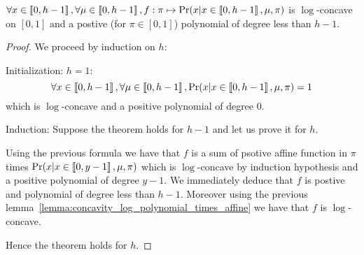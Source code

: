 \begin{thm}
    $\forall x \in \left\llbracket0, h - 1\right\rrbracket, \forall \mu \in \left\llbracket0, h - 1\right\rrbracket, f: \pi \mapsto \Pr(x | x \in \left\llbracket0, h - 1\right\rrbracket, \mu, \pi)$ is $\log$-concave on $[0, 1]$ and a postive (for $\pi \in [0, 1]$) polynomial of degree less than $h - 1$.
\end{thm}
\begin{proof}
    We proceed by induction on $h$:

    Initialization: $h = 1$: 
    \[ \forall x \in \left\llbracket0, h - 1\right\rrbracket, \forall \mu \in \left\llbracket0, h - 1\right\rrbracket, \Pr(x | x \in \left\llbracket0, h - 1\right\rrbracket, \mu, \pi) = 1\] which is $\log$-concave and a positive polynomial of degree $0$.

    Induction: Suppose the theorem holds for $h - 1$ and let us prove it for $h$.

    Using the previous formula we have that $f$ is a sum of psotive affine function in $\pi$ times $\Pr(x | x \in \left\llbracket0, y - 1\right\rrbracket, \mu, \pi)$ which is $\log$-concave by induction hypothesis and a positive polynomial of degree $y - 1$. We immediately deduce that $f$ is postive and polynomial of degree less than $h - 1$. Moreover using the previous lemma~\ref{lemma:concavity_log_polynomial_times_affine} we have that $f$ is $\log$-concave.

    Hence the theorem holds for $h$.
\end{proof}

